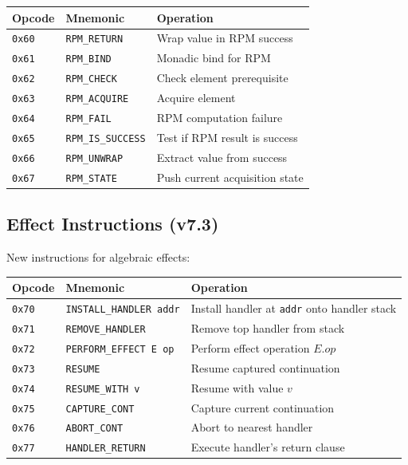 \begin{definition}
\label{def:rpm-instructions}
\begin{center}
\begin{tabular}{llp{7cm}}
\toprule
\textbf{Opcode} & \textbf{Mnemonic} & \textbf{Operation} \\
\midrule
\texttt{0x60} & \texttt{RPM\_RETURN} & Wrap value in RPM success \\
\texttt{0x61} & \texttt{RPM\_BIND} & Monadic bind for RPM \\
\texttt{0x62} & \texttt{RPM\_CHECK} & Check element prerequisite \\
\texttt{0x63} & \texttt{RPM\_ACQUIRE} & Acquire element \\
\texttt{0x64} & \texttt{RPM\_FAIL} & RPM computation failure \\
\texttt{0x65} & \texttt{RPM\_IS\_SUCCESS} & Test if RPM result is success \\
\texttt{0x66} & \texttt{RPM\_UNWRAP} & Extract value from success \\
\texttt{0x67} & \texttt{RPM\_STATE} & Push current acquisition state \\
\bottomrule
\end{tabular}
\end{center}
\end{definition}

\subsection{Effect Instructions (v7.3)}
\label{subsec:effect-instructions}

\begin{definition}
\label{def:effect-instructions}
New instructions for algebraic effects:
\begin{center}
\begin{tabular}{llp{6.5cm}}
\toprule
\textbf{Opcode} & \textbf{Mnemonic} & \textbf{Operation} \\
\midrule
\texttt{0x70} & \texttt{INSTALL\_HANDLER addr} & Install handler at \texttt{addr} onto handler stack \\
\texttt{0x71} & \texttt{REMOVE\_HANDLER} & Remove top handler from stack \\
\texttt{0x72} & \texttt{PERFORM\_EFFECT E op} & Perform effect operation $E.\mathit{op}$ \\
\texttt{0x73} & \texttt{RESUME} & Resume captured continuation \\
\texttt{0x74} & \texttt{RESUME\_WITH v} & Resume with value $v$ \\
\texttt{0x75} & \texttt{CAPTURE\_CONT} & Capture current continuation \\
\texttt{0x76} & \texttt{ABORT\_CONT} & Abort to nearest handler \\
\texttt{0x77} & \texttt{HANDLER\_RETURN} & Execute handler's return clause \\
\bottomrule
\end{tabular}
\end{center}
\end{definition}

